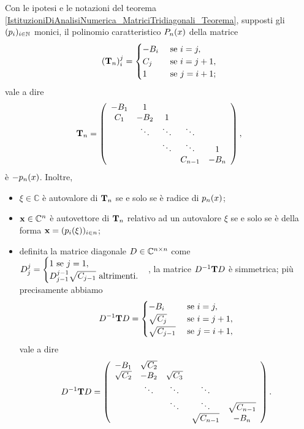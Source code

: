 \begin{Theorem}
	\label{IstituzioniDiAnalisiNumerica_RadiciEAutovalori}
	Con le ipotesi e le notazioni del teorema \ref{IstituzioniDiAnalisiNumerica_MatriciTridiagonali_Teorema}, supposti gli $(p_i)_{i \in \mathbb{N}}$ monici, il polinomio caratteristico $P_n(x)$ della matrice
	\[
		(\mathbf{T}_n)_i^j =
		\begin{cases}
			- B_i&\text{ se }i = j,\\
			C_j&\text{ se }i = j + 1,\\
			1&\text{ se }j = i + 1;
		\end{cases}
	\]
	vale a dire
	\[
	\mathbf{T}_n =
	\left (
	\begin{array}{ccccc}
		- B_1	&	1		&		&		&\\
		C_1		&	- B_2	&	1	&		&\\
				&	\ddots		&	\ddots	&	\ddots	&\\
				&			&	\ddots	&	\ddots	&	1\\
				&			&	&	C_{n - 1}	&	- B_n
	\end{array}
	\right ),
	\]
	\`e $- p_n(x)$.
	Inoltre,
	\begin{itemize}
		\item $\xi \in \mathbb{C}$ \`e autovalore di $\mathbf{T}_n$ se e solo se \`e radice di $p_n(x)$;
		\item $\Eigenvector \in \mathbb{C}^n$ \`e autovettore di $\mathbf{T}_n$ relativo ad un autovalore $\xi$ se e solo se \`e della forma $\Eigenvector = (\OrthogonalPolynomial_i(\xi))_{i \in n}$;
		\item definita la matrice diagonale $D \in \mathbb{C}^{n \times n}$ come $D_j^j = \begin{cases}1\text{ se }j = 1,\\D_{j - 1}^{j - 1}\sqrt{C_{j - 1}}\text{ altrimenti}.\end{cases}$, la matrice $D^{-1}\mathbf{T}D$ \`e simmetrica; pi\`u precisamente abbiamo
	\[
	D^{-1}\mathbf{T}D =
	\begin{cases}
		- B_i&\text{ se }i = j,\\
		\sqrt{C_j}&\text{ se }i = j + 1,\\
		\sqrt{C_{j - 1}}&\text{ se }j = i + 1,
	\end{cases}
	\]
	vale a dire
	\[
		D^{-1}\mathbf{T}D =
		\left (
		\begin{array}{ccccc}
			- B_1	&	\sqrt{C_2}		&		&		&\\
			\sqrt{C_2}		&	- B_2	&	\sqrt{C_3}	&		&\\
					&	\ddots		&	\ddots	&	\ddots	&\\
					&			&	\ddots	&	\ddots	&	\sqrt{C_{n - 1}}\\
					&			&	&	\sqrt{C_{n - 1}}	&	- B_n
		\end{array}
		\right ).
	\]
	\end{itemize}
\end{Theorem}
